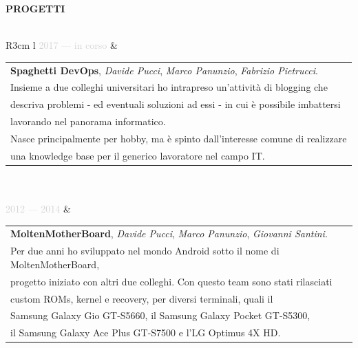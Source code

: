 \documentclass{article}
\begin{document}
\textbf{\textcolor{deepblue}{PROGETTI}} \\\\ \hfill
\begin{tabular}{ R{3cm} l }
	\textcolor{lightgray}{2017 — in corso} &
		\begin{tabular}[l]{@{}l@{}}
			\textbf{Spaghetti DevOps}, \textit{Davide Pucci}, \textit{Marco Panunzio}, \textit{Fabrizio Pietrucci}. \\
			Insieme a due colleghi universitari ho intrapreso un'attivit\`a di blogging che \\
			descriva problemi - ed eventuali soluzioni ad essi - in cui \`e possibile imbattersi \\
			lavorando nel panorama informatico. \\
			Nasce principalmente per hobby, ma \`e spinto dall'interesse comune di realizzare \\
			una knowledge base per il generico lavoratore nel campo IT.
		\end{tabular} \\\\ \hfill
	\textcolor{lightgray}{2012 — 2014} &
		\begin{tabular}[l]{@{}l@{}} %
			\textbf{MoltenMotherBoard}, \textit{Davide Pucci}, \textit{Marco Panunzio}, \textit{Giovanni Santini}. \\
			Per due anni ho sviluppato nel mondo Android sotto il nome di MoltenMotherBoard,                       \\
			progetto iniziato con altri due colleghi. Con questo team sono stati rilasciati                        \\
			custom ROMs, kernel e recovery, per diversi terminali, quali il                                        \\
			Samsung Galaxy Gio GT-S5660, il Samsung Galaxy Pocket GT-S5300,                                        \\
			il Samsung Galaxy Ace Plus GT-S7500 e l'LG Optimus 4X HD.
		\end{tabular} \\\\ \hfill
\end{tabular}
\end{document}
